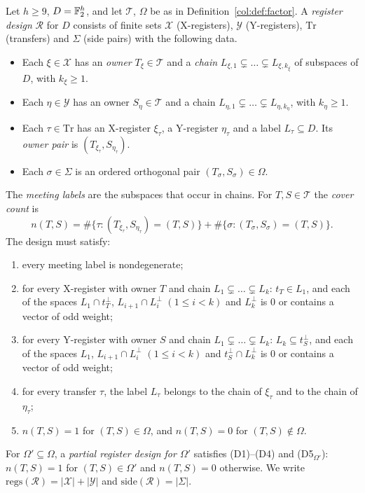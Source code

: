 \begin{definition}\label{col:def:design}
Let $h\ge 9$, $D=\mathbb{F}_2^h$, and let $\mathcal T$, $\Omega$ be as in Definition~\ref{col:def:factor}. A
\emph{register design} $\mathcal R$ for $D$ consists of finite sets $\mathcal X$ (X-registers),
$\mathcal Y$ (Y-registers), $\mathrm{Tr}$ (transfers) and $\Sigma$ (side pairs) with the following
data.
\begin{itemize}
\item Each $\xi\in\mathcal X$ has an \emph{owner} $T_\xi\in\mathcal T$ and a \emph{chain}
  $L_{\xi,1}\subsetneq\dots\subsetneq L_{\xi,k_\xi}$ of subspaces of $D$, with $k_\xi\ge1$.
\item Each $\eta\in\mathcal Y$ has an owner $S_\eta\in\mathcal T$ and a chain
  $L_{\eta,1}\subsetneq\dots\subsetneq L_{\eta,k_\eta}$, with $k_\eta\ge1$.
\item Each $\tau\in\mathrm{Tr}$ has an X-register $\xi_\tau$, a Y-register $\eta_\tau$ and a label
  $L_\tau\subseteq D$. Its \emph{owner pair} is $(T_{\xi_\tau},S_{\eta_\tau})$.
\item Each $\sigma\in\Sigma$ is an ordered orthogonal pair $(T_\sigma,S_\sigma)\in\Omega$.
\end{itemize}
The \emph{meeting labels} are the subspaces that occur in chains. For $T,S\in\mathcal T$ the
\emph{cover count} is
\[
  n(T,S)=\#\{\tau:(T_{\xi_\tau},S_{\eta_\tau})=(T,S)\}+\#\{\sigma:(T_\sigma,S_\sigma)=(T,S)\}.
\]
The design must satisfy:
\begin{enumerate}
\item[(D1)] every meeting label is nondegenerate;
\item[(D2)] for every X-register with owner $T$ and chain $L_1\subsetneq\dots\subsetneq L_k$:
  $t_T\in L_1$, and each of the spaces $L_1\cap t_T^\perp$, $L_{i+1}\cap L_i^\perp$ $(1\le i<k)$ and
  $L_k^\perp$ is $0$ or contains a vector of odd weight;
\item[(D3)] for every Y-register with owner $S$ and chain $L_1\subsetneq\dots\subsetneq L_k$:
  $L_k\subseteq t_S^\perp$, and each of the spaces $L_1$, $L_{i+1}\cap L_i^\perp$ $(1\le i<k)$ and
  $t_S^\perp\cap L_k^\perp$ is $0$ or contains a vector of odd weight;
\item[(D4)] for every transfer $\tau$, the label $L_\tau$ belongs to the chain of $\xi_\tau$ and to the
  chain of $\eta_\tau$;
\item[(D5)] $n(T,S)=1$ for $(T,S)\in\Omega$, and $n(T,S)=0$ for $(T,S)\notin\Omega$.
\end{enumerate}
For $\Omega'\subseteq\Omega$, a \emph{partial register design for $\Omega'$} satisfies (D1)--(D4) and
(D5$_{\Omega'}$): $n(T,S)=1$ for $(T,S)\in\Omega'$ and $n(T,S)=0$ otherwise. We write
$\mathrm{regs}(\mathcal R)=|\mathcal X|+|\mathcal Y|$ and $\mathrm{side}(\mathcal R)=|\Sigma|$.
\end{definition}

